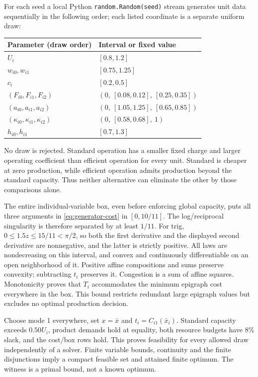 For each seed a local Python \texttt{random.Random(seed)} stream generates unit data sequentially in the following order; each listed coordinate is a separate uniform draw:
\begin{center}\small
\begin{tabular}{ll}\toprule
Parameter (draw order) & Interval or fixed value\\\midrule
$U_i$ & $[0.8,1.2]$\\
$w_{i0},w_{i1}$ & $[0.75,1.25]$\\
$c_i$ & $[0.2,0.5]$\\
$(F_{i0},F_{i1},F_{i2})$ & $(0,\ [0.08,0.12],\ [0.25,0.35])$\\
$(a_{i0},a_{i1},a_{i2})$ & $(0,\ [1.05,1.25],\ [0.65,0.85])$\\
$(\kappa_{i0},\kappa_{i1},\kappa_{i2})$ & $(0,\ [0.58,0.68],\ 1)$\\
$h_{i0},h_{i1}$ & $[0.7,1.3]$\\\bottomrule
\end{tabular}\end{center}
No draw is rejected. Standard operation has a smaller fixed charge and larger operating coefficient than efficient operation for every unit. Standard is cheaper at zero production, while efficient operation admits production beyond the standard capacity. Thus neither alternative can eliminate the other by those comparisons alone.

The entire individual-variable box, even before enforcing global capacity, puts all three arguments in \eqref{eq:generator-cost} in $[0,10/11]$. The log/reciprocal singularity is therefore separated by at least $1/11$. For trig, $0\le1.5z\le15/11<\pi/2$, so both the first derivative and the displayed second derivative are nonnegative, and the latter is strictly positive. All laws are nondecreasing on this interval, and convex and continuously differentiable on an open neighborhood of it. Positive affine compositions and sums preserve convexity; subtracting $t_i$ preserves it. Congestion is a sum of affine squares. Monotonicity proves that $T_i$ accommodates the minimum epigraph cost everywhere in the box. This bound restricts redundant large epigraph values but excludes no optimal production decision.

Choose mode 1 everywhere, set $x=\bar x$ and $t_i=C_{i1}(\bar x_i)$. Standard capacity exceeds $0.50U_i$, product demands hold at equality, both resource budgets have 8\% slack, and the cost/box rows hold. This proves feasibility for every allowed draw independently of a solver. Finite variable bounds, continuity and the finite disjunctions imply a compact feasible set and attained finite optimum. The witness is a primal bound, not a known optimum.

